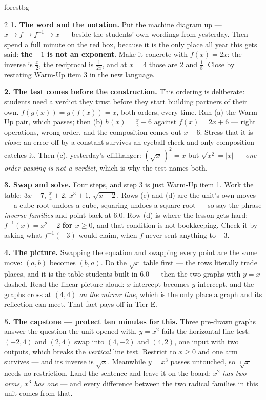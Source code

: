 \documentclass[10pt]{article}
\begin{document}
\begin{skillbox}[Lesson]{forestbg}
\begin{multicols}{2}
\textbf{1. The word and the notation.} Put the machine diagram up --- $x\to f\to f^{-1}\to x$ ---
beside the students' own wordings from yesterday. Then spend a full minute on the red box, because
it is the only place all year this gets said: \textbf{the $-1$ is not an exponent}. Make it concrete
with $f(x)=2x$: the inverse is $\frac{x}{2}$, the reciprocal is $\frac{1}{2x}$, and at $x=4$ those
are $2$ and $\frac18$. Close by restating Warm-Up item 3 in the new language.

\textbf{2. The test comes before the construction.} This ordering is deliberate: students need a
verdict they trust before they start building partners of their own. $f(g(x))=g(f(x))=x$, both
orders, every time. Run (a) the Warm-Up pair, which passes; then (b) $h(x)=\frac{x}{2}-6$ against
$f(x)=2x+6$ --- right operations, wrong order, and the composition comes out $x-6$. Stress that it
is \emph{close}: an error off by a constant survives an eyeball check and only composition catches
it. Then (c), yesterday's cliffhanger: $\left(\sqrt{x}\,\right)^{2}=x$ but $\sqrt{x^{2}}=|x|$ ---
\emph{one order passing is not a verdict}, which is why the test names both.

\textbf{3. Swap and solve.} Four steps, and step 3 is just Warm-Up item 1. Work the table: $3x-7$,
$\frac{x}{4}+2$, $x^{3}+1$, $\sqrt{x-2}$. Rows (c) and (d) are the unit's own moves --- a cube root
undoes a cube, squaring undoes a square root --- so say the phrase \emph{inverse families} and point
back at 6.0. Row (d) is where the lesson gets hard: $f^{-1}(x)=x^{2}+2$ \textbf{for $x\ge0$}, and
that condition is not bookkeeping. Check it by asking what $f^{-1}(-3)$ would claim, when $f$ never
sent anything to $-3$.

\columnbreak

\textbf{4. The picture.} Swapping the equation and swapping every point are the same move: $(a,b)$
becomes $(b,a)$. Do the $\sqrt{x}$ table first --- the rows literally trade places, and it is the
table students built in 6.0 --- then the two graphs with $y=x$ dashed. Read the linear picture
aloud: $x$-intercept becomes $y$-intercept, and the graphs cross at $(4,4)$ \emph{on the mirror
line}, which is the only place a graph and its reflection can meet. That fact pays off in Tier E.

\textbf{5. The capstone --- protect ten minutes for this.} Three pre-drawn graphs answer the
question the unit opened with. $y=x^{2}$ fails the horizontal line test: $(-2,4)$ and $(2,4)$ swap
into $(4,-2)$ and $(4,2)$, one input with two outputs, which breaks the \emph{vertical} line test.
Restrict to $x\ge0$ and one arm survives --- and its inverse is $\sqrt{x}$. Meanwhile $y=x^{3}$
passes untouched, so $\sqrt[3]{x}$ needs no restriction. Land the sentence and leave it on the
board: \emph{$x^{2}$ has two arms, $x^{3}$ has one} --- and every difference between the two radical
families in this unit comes from that.


\end{multicols}
\end{skillbox}
\end{document}
